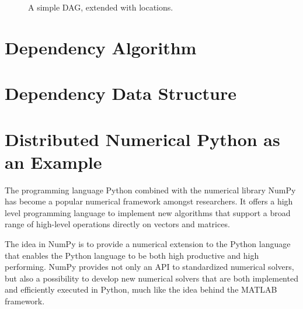 \documentclass[preprint]{../PGAS10/sigplanconf}
\begin{document}
\begin{figure}
  \begin{center}
    \caption{A simple DAG, extended with locations.}
    \label{fig:MonteCarlo}
  \end{center}
\end{figure}





\section{Dependency Algorithm}


\section{Dependency Data Structure}



\section{Distributed Numerical Python as an Example}
The programming language Python combined with the numerical library NumPy\cite{numpy} has become a popular numerical framework amongst researchers. It offers a high level programming language to implement new algorithms that support a broad range of high-level operations directly on vectors and matrices.

The idea in NumPy is to provide a numerical extension to the Python language that enables the Python language to be both high productive and high performing. NumPy provides not only an API to standardized numerical solvers, but also a possibility to develop new numerical solvers that are both implemented and efficiently executed in Python, much like the idea behind the MATLAB\cite{guide1998mathworks} framework. 
\end{document}
